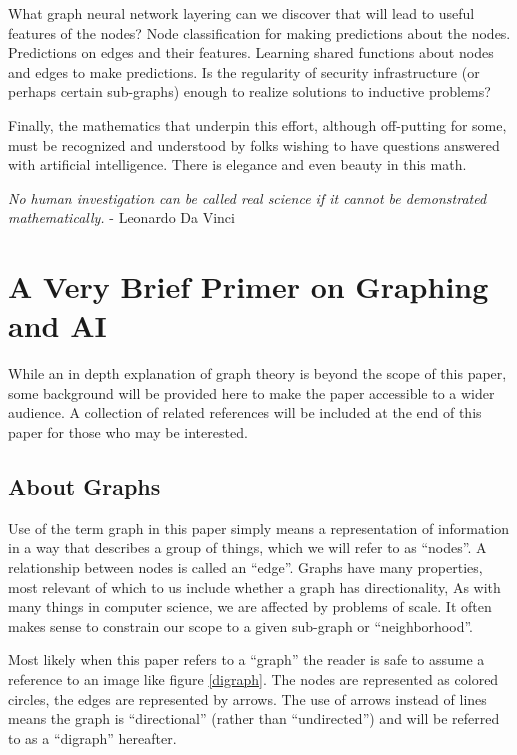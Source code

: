 What graph neural network layering can we discover that will lead to useful features of the nodes?
  Node classification for making predictions about the nodes.
  Predictions on edges and their features.
  Learning shared functions about nodes and edges to make predictions.
Is the regularity of security infrastructure (or perhaps certain sub-graphs) enough to realize solutions to inductive problems?

\justifying
Finally, the mathematics that underpin this effort, although off-putting for some, must be recognized and understood by
folks wishing to have questions answered with artificial intelligence. There is elegance and even beauty in this math.
\vspace{2mm}

\begin{displayquote}
	\emph{No human investigation can be called real science if it cannot be demonstrated mathematically.}
	- Leonardo Da Vinci
\end{displayquote}

\clearpage
\section{\label{sec:primer}A Very Brief Primer on Graphing and AI}

\justifying
While an in depth explanation of graph theory is beyond the scope of this paper, some background
will be provided here to make the paper accessible to a wider audience. A collection of related references
will be included at the end of this paper for those who may be interested.

\subsection{\label{sec:Graph}About Graphs}

\justifying
Use of the term graph in this paper simply means a representation of information in a way that describes a group of
things, which we will refer to as ``nodes''. A relationship between nodes is called an ``edge''. Graphs have many
properties, most relevant of which to us include whether a graph has directionality, As with many things in computer
science, we are affected by problems of scale. It often makes sense to constrain our scope to a given sub-graph or ``neighborhood''.
\vspace{2mm}

\justifying
Most likely when this paper refers to a ``graph'' the reader is safe to assume a reference to an image like figure \ref{digraph}. The nodes are represented as colored circles, the edges are represented by arrows. The use of arrows
instead of lines means the graph is ``directional'' (rather than ``undirected'') and will be referred to as a ``digraph''
hereafter.
\vspace{2mm}

